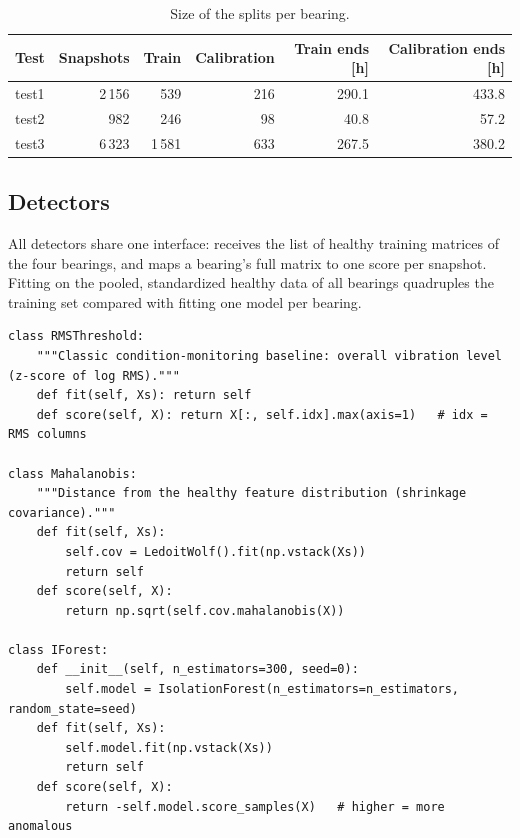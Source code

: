 \documentclass[11pt]{article}
\begin{document}
\begin{table}[H]
\centering
\caption{Size of the splits per bearing.}
\label{tab:splits}
\begin{tabular}{lrrrrr}
\toprule
Test & Snapshots & Train & Calibration & Train ends [h] & Calibration ends [h] \\
\midrule
test1 & 2\,156 & 539   & 216 & 290.1 & 433.8 \\
test2 & 982    & 246   & 98  & 40.8  & 57.2 \\
test3 & 6\,323 & 1\,581 & 633 & 267.5 & 380.2 \\
\bottomrule
\end{tabular}
\end{table}

\subsection{Detectors}
All detectors share one interface:  receives the list of healthy training matrices of the
four bearings, and  maps a bearing's full matrix to one score per snapshot. Fitting on the
pooled, standardized healthy data of all bearings quadruples the training set compared with fitting
one model per bearing.

\begin{lstlisting}[caption={Classical detectors (excerpt of \code{src/bearing\_efw/models.py}).},label=lst:models]
class RMSThreshold:
    """Classic condition-monitoring baseline: overall vibration level (z-score of log RMS)."""
    def fit(self, Xs): return self
    def score(self, X): return X[:, self.idx].max(axis=1)   # idx = RMS columns

class Mahalanobis:
    """Distance from the healthy feature distribution (shrinkage covariance)."""
    def fit(self, Xs):
        self.cov = LedoitWolf().fit(np.vstack(Xs))
        return self
    def score(self, X):
        return np.sqrt(self.cov.mahalanobis(X))

class IForest:
    def __init__(self, n_estimators=300, seed=0):
        self.model = IsolationForest(n_estimators=n_estimators, random_state=seed)
    def fit(self, Xs):
        self.model.fit(np.vstack(Xs))
        return self
    def score(self, X):
        return -self.model.score_samples(X)   # higher = more anomalous
\end{lstlisting}
\end{document}
